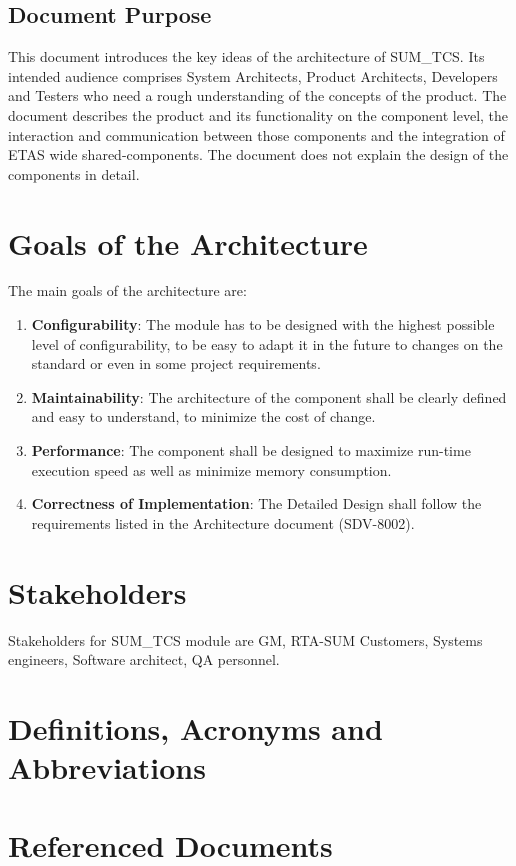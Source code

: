\subsection{Document Purpose}

This document introduces the key ideas of the architecture of SUM_TCS.
Its intended audience comprises System Architects, Product Architects, Developers and Testers who need a rough understanding of the concepts of the product.
The document describes the product and its functionality on the component level, the interaction and communication between those components and the integration of ETAS wide shared-components.
The document does not explain the design of the components in detail.

\section{Goals of the Architecture}

The main goals of the architecture are:

\begin{enumerate}
\item \textbf{Configurability}: The module has to be designed with the highest possible level of configurability, to be easy to adapt it in the future to changes on the standard or even in some project requirements.
\item \textbf{Maintainability}: The architecture of the component shall be clearly defined and easy to understand, to minimize the cost of change.
\item \textbf{Performance}: The component shall be designed to maximize run-time execution speed as well as minimize memory consumption.
\item \textbf{Correctness of Implementation}: The Detailed Design shall follow the requirements listed in the Architecture document (SDV-8002).
\end{enumerate}

\section{Stakeholders}

Stakeholders for SUM\_TCS module are GM, RTA-SUM Customers, Systems engineers, Software architect, QA personnel.

\section{Definitions, Acronyms and Abbreviations}



\section{Referenced Documents}

